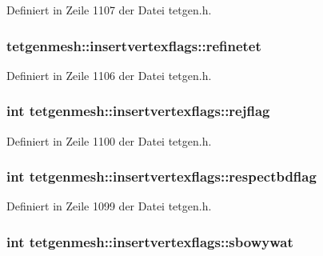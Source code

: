 Definiert in Zeile 1107 der Datei tetgen.\-h.

\hypertarget{classtetgenmesh_1_1insertvertexflags_ae8de017a73bd8cd9b6de4f67ae89e2c8}{
\subsubsection[{refinetet}]{ tetgenmesh\-::insertvertexflags\-::refinetet}}\label{classtetgenmesh_1_1insertvertexflags_ae8de017a73bd8cd9b6de4f67ae89e2c8}


Definiert in Zeile 1106 der Datei tetgen.\-h.

\hypertarget{classtetgenmesh_1_1insertvertexflags_af0c3e729085371144fd64069dc88d0ca}{
\subsubsection[{rejflag}]{\setlength{\rightskip}{0pt plus 5cm}int tetgenmesh\-::insertvertexflags\-::rejflag}}\label{classtetgenmesh_1_1insertvertexflags_af0c3e729085371144fd64069dc88d0ca}


Definiert in Zeile 1100 der Datei tetgen.\-h.

\hypertarget{classtetgenmesh_1_1insertvertexflags_ae953afe4a3a59188b59fabe96cfe1d47}{
\subsubsection[{respectbdflag}]{\setlength{\rightskip}{0pt plus 5cm}int tetgenmesh\-::insertvertexflags\-::respectbdflag}}\label{classtetgenmesh_1_1insertvertexflags_ae953afe4a3a59188b59fabe96cfe1d47}


Definiert in Zeile 1099 der Datei tetgen.\-h.

\hypertarget{classtetgenmesh_1_1insertvertexflags_a9d380c4151120f6d0008ee61a0f410d3}{
\subsubsection[{sbowywat}]{\setlength{\rightskip}{0pt plus 5cm}int tetgenmesh\-::insertvertexflags\-::sbowywat}}\label{classtetgenmesh_1_1insertvertexflags_a9d380c4151120f6d0008ee61a0f410d3}


